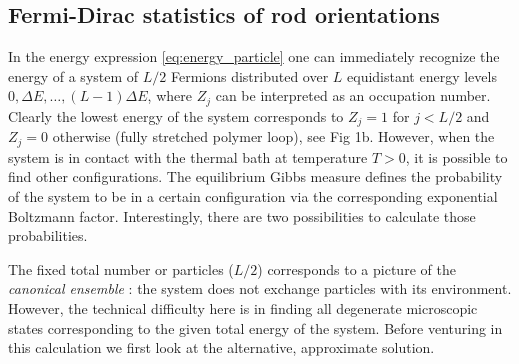 \documentclass[aps,showpacs,twocolumn,floatfix,prx,superscriptaddress]{revtex4-1}
\begin{document}
\subsection{Fermi-Dirac statistics of rod orientations}
In the energy expression \eqref{eq:energy_particle} one can immediately recognize
the energy of a system of $L/2$ Fermions distributed over
$L$ equidistant energy levels $0, \Delta E, \ldots, (L-1) \Delta E$, where
$Z_j$ can be interpreted as an occupation number. Clearly the lowest energy of the system corresponds to $Z_j = 1$ for $j < L/2$ and
$Z_j=0$ otherwise (fully stretched polymer loop), see Fig 1b. However, when the system is in contact with the thermal bath
at temperature $T>0$, it is possible to find other configurations. The equilibrium
Gibbs measure defines the probability of the system to be in a certain configuration via the corresponding exponential Boltzmann factor.
Interestingly, there are two possibilities to calculate those probabilities. 


The fixed total number or particles ($L/2$) corresponds to a picture of the
\emph{canonical ensemble} \cite{Chandler1987,Huang2001}: the system does not exchange particles with
its environment. However, the technical difficulty here is in finding all degenerate microscopic states corresponding to the given total energy of the system. Before venturing in this calculation we first look at the alternative, approximate solution.

\end{document}
